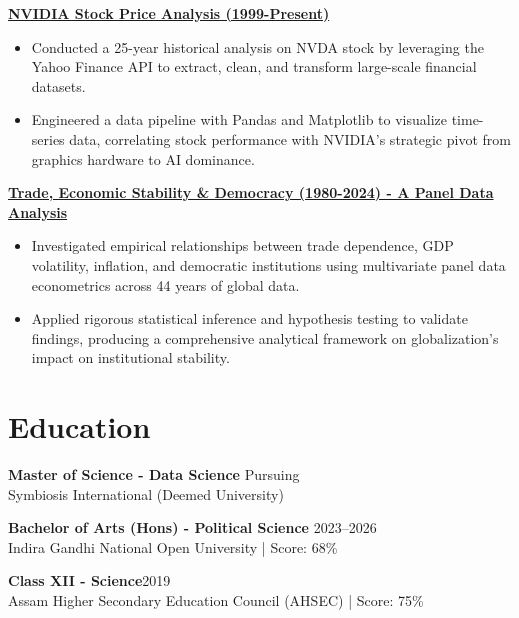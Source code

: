 \documentclass[10pt, a4paper]{article}
\begin{document}
	\noindent\href{https://github.com/marvinminhaz/nvidia-stock-insights}{\textbf{NVIDIA Stock Price Analysis (1999-Present)}} \hfill
	\begin{itemize}[leftmargin=0.15in, topsep=2pt, partopsep=0pt, parsep=0pt, itemsep=2pt]
		\item Conducted a 25-year historical analysis on NVDA stock by leveraging the Yahoo Finance API to extract, clean, and transform large-scale financial datasets.
		\item Engineered a data pipeline with Pandas and Matplotlib to visualize time-series data, correlating stock performance with NVIDIA's strategic pivot from graphics hardware to AI dominance.
	\end{itemize}
	\vspace{0.6em}
	
	\noindent\href{https://github.com/marvinminhaz/Trade_dependence_Economic_Stability_and_Democracy_Project}{\textbf{Trade, Economic Stability \& Democracy (1980-2024) - A Panel Data Analysis}} \hfill 
	\begin{itemize}[leftmargin=0.15in, partopsep=0pt, parsep=0pt, topsep=2pt, itemsep=2pt]
		\item Investigated empirical relationships between trade dependence, GDP volatility, inflation, and democratic institutions using multivariate panel data econometrics across 44 years of global data.
		\item Applied rigorous statistical inference and hypothesis testing to validate findings, producing a comprehensive analytical framework on globalization's impact on institutional stability.
	\end{itemize}
	\vspace{0.6em}
	
	
	\section{Education}
	\noindent\textbf{Master of Science - Data Science} \hfill Pursuing\\
	Symbiosis International (Deemed University)\vspace{0.5em}
	
	\noindent\textbf{Bachelor of Arts (Hons) - Political Science} \hfill 2023--2026\\
	Indira Gandhi National Open University | Score: 68\% \vspace{0.5em}
	
	\noindent\textbf{Class XII - Science}\hfill 2019\\
	Assam Higher Secondary Education Council (AHSEC) | Score: 75\% \vspace{0.5em}
\end{document}

